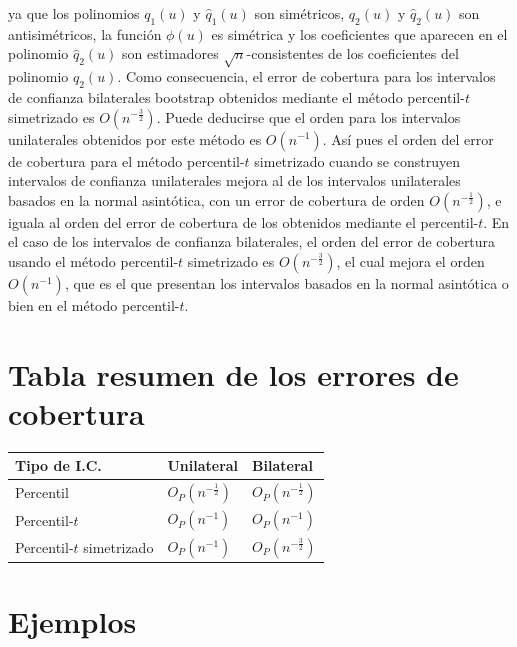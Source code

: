 \documentclass[
]{book}
\newcounter{none} %
\theoremstyle{break}
\theoremstyle{nonumberplain}
\begin{document}
ya que los polinomios \(q_1\left( u \right)\) y
\(\hat{q}_1\left( u \right)\) son simétricos, \(q_2\left( u \right)\) y
\(\hat{q}_2\left( u \right)\) son antisimétricos, la función
\(\phi \left( u \right)\) es simétrica y los coeficientes que aparecen en
el polinomio \(\hat{q}_2\left(
u \right)\) son estimadores \(\sqrt{n}\)-consistentes de los coeficientes
del polinomio \(q_2\left( u \right)\). Como consecuencia, el error de
cobertura para los intervalos de confianza bilaterales bootstrap
obtenidos mediante el método percentil-\(t\) simetrizado es
\(O\left( n^{-\frac{3}{2}} \right)\). Puede deducirse que el orden para
los intervalos unilaterales obtenidos por este método es
\(O\left( n^{-1} \right)\). Así pues el orden del error de cobertura para
el método percentil-\(t\) simetrizado cuando se construyen intervalos de
confianza unilaterales mejora al de los intervalos unilaterales basados
en la normal asintótica, con un error de cobertura de orden
\(O\left( n^{-\frac{1}{2}} \right)\), e iguala al orden del error de
cobertura de los obtenidos mediante el percentil-\(t\). En el caso de los
intervalos de confianza bilaterales, el orden del error de cobertura
usando el método percentil-\(t\) simetrizado es
\(O\left( n^{-\frac{3}{2}} \right)\), el cual mejora el orden
\(O\left( n^{-1} \right)\), que es el que presentan los intervalos basados
en la normal asintótica o bien en el método percentil-\(t\).

\section{Tabla resumen de los errores de cobertura}\label{cap-err-cober}

{\def\LTcaptype{none} %
\begin{longtable}[]{@{}lll@{}}
\toprule\noalign{}
Tipo de I.C. & Unilateral & Bilateral \\
\midrule\noalign{}
\endhead
\bottomrule\noalign{}
\endlastfoot
Percentil & \(O_{P}\left( n^{-\frac{1}{2}}\right)\) & \(O_{P}\left(n^{-\frac{1}{2}} \right)\) \\
Percentil-\(t\) & \(O_{P}\left( n^{-1} \right)\) & \(O_{P}\left( n^{-1} \right)\) \\
Percentil-\(t\) simetrizado & \(O_{P}\left( n^{-1} \right)\) & \(O_{P}\left( n^{-\frac{3}{2}} \right)\) \\
\end{longtable}
}

\section{Ejemplos}\label{icboot-ejem}
\end{document}
